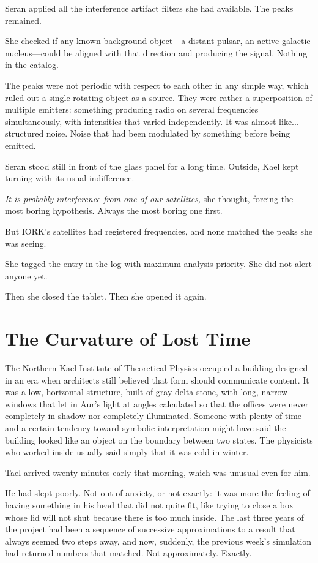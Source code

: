 \documentclass[11pt,a5paper,twoside]{book}
\begin{document}
Seran applied all the interference artifact filters she had available. The peaks remained.

She checked if any known background object—a distant pulsar, an active galactic nucleus—could be aligned with that direction and producing the signal. Nothing in the catalog.

The peaks were not periodic with respect to each other in any simple way, which ruled out a single rotating object as a source. They were rather a superposition of multiple emitters: something producing radio on several frequencies simultaneously, with intensities that varied independently. It was almost like... structured noise. Noise that had been modulated by something before being emitted.

Seran stood still in front of the glass panel for a long time. Outside, Kael kept turning with its usual indifference.

\textit{It is probably interference from one of our satellites,} she thought, forcing the most boring hypothesis. Always the most boring one first.

But IORK's satellites had registered frequencies, and none matched the peaks she was seeing.

She tagged the entry in the log with maximum analysis priority. She did not alert anyone yet.

Then she closed the tablet. Then she opened it again.

\chapter{The Curvature of Lost Time}

The Northern Kael Institute of Theoretical Physics occupied a building designed in an era when architects still believed that form should communicate content. It was a low, horizontal structure, built of gray delta stone, with long, narrow windows that let in Aur’s light at angles calculated so that the offices were never completely in shadow nor completely illuminated. Someone with plenty of time and a certain tendency toward symbolic interpretation might have said the building looked like an object on the boundary between two states. The physicists who worked inside usually said simply that it was cold in winter.

Tael arrived twenty minutes early that morning, which was unusual even for him.

He had slept poorly. Not out of anxiety, or not exactly: it was more the feeling of having something in his head that did not quite fit, like trying to close a box whose lid will not shut because there is too much inside. The last three years of the project had been a sequence of successive approximations to a result that always seemed two steps away, and now, suddenly, the previous week's simulation had returned numbers that matched. Not approximately. Exactly.
\end{document}
